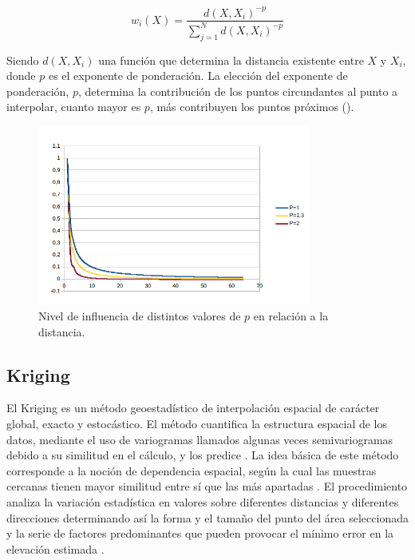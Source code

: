 \begin{equation}
w_i(X) =  \dfrac{d(X, X_i)^{-p}}{\sum_{j=1}^{N} d(X, X_i)^{-p}}
\end{equation}


Siendo $d(X, X_i)$ una función que determina la distancia existente entre $X$ y $X_{i}$, donde $p$
es el exponente de ponderación. La elección del exponente de ponderación, $p$, determina la
contribución de los puntos circundantes al punto a interpolar, cuanto mayor es $p$, más
contribuyen los puntos próximos ().

\begin{figure}[!htbp]
\centering
\includegraphics[width=0.8\textwidth]{capitulo-2/graphics/idw-parametros.png}
\caption{\label{fig:sig-idw-parametros} Nivel de influencia de distintos valores de $p$ en
relación a la distancia.}

\end{figure}

\subsection{Kriging}
El Kriging es un método geoestadístico de interpolación espacial de carácter global, exacto y
estocástico\citep{NINO2011}. El método cuantifica la estructura espacial de los datos, mediante el
uso de variogramas llamados algunas veces semivariogramas debido a su similitud en el cálculo, y
los predice \citep{villatoro2007comparacion}. La idea básica de este método corresponde a la
noción de dependencia espacial, según la cual las muestras cercanas tienen mayor similitud entre
sí que las más apartadas \citep{NINO2011}. El procedimiento analiza la variación estadística en
valores sobre diferentes distancias y diferentes direcciones determinando así la forma y el tamaño
del punto del área seleccionada y la serie de factores predominantes que pueden provocar el mínimo
error en la elevación estimada \citep{cPachecoMDE2003}.

